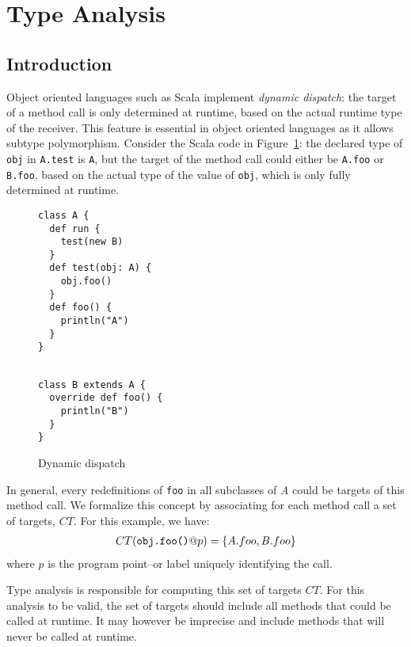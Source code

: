 \section{Type Analysis}

\subsection{Introduction}
Object oriented languages such as Scala implement \emph{dynamic dispatch}: the
target of a method call is only determined at runtime, based on the actual
runtime type of the receiver. This feature is essential in object oriented
languages as it allows subtype polymorphism. Consider the Scala code in
Figure~\ref{fig:ta:example1}: the declared type of \lstinline{obj} in
\lstinline{A.test} is \lstinline{A}, but the target of the method call could
either be \lstinline{A.foo} or \lstinline{B.foo}, based on the actual type of
the value of \lstinline{obj}, which is only fully determined at runtime.

\begin{figure}[h]
    \centering
\begin{minipage}[tl]{0.6\linewidth}
    \centering
\lstset{linewidth=0.6\linewidth}
\begin{lstlisting}
class A {
  def run {
    test(new B)
  }
  def test(obj: A) {
    obj.foo()
  }
  def foo() {
    println("A")
  }
}
\end{lstlisting}
\end{minipage}
\begin{minipage}[tl]{0.6\linewidth}
    \centering
\lstset{linewidth=0.6\linewidth}
\begin{lstlisting}

class B extends A {
  override def foo() {
    println("B")
  }
}
\end{lstlisting}
\end{minipage}
    \caption{Dynamic dispatch}
    \label{fig:ta:example1}
\end{figure}

In general, every redefinitions of \lstinline{foo} in all subclasses of
\emph{A} could be targets of this method call. We formalize this concept
by associating for each method call a set of targets, $CT$. For this example,
we have:
\begin{eqnarray*}
    CT(\verb/obj.foo()/@p) = \{A.foo, B.foo\}
\end{eqnarray*}
where $p$ is the program point--or label uniquely identifying the call.

Type analysis is responsible for computing this set of targets $CT$. For this
analysis to be valid, the set of targets should include all methods that could
be called at runtime. It may however be imprecise and include methods that will
never be called at runtime.

